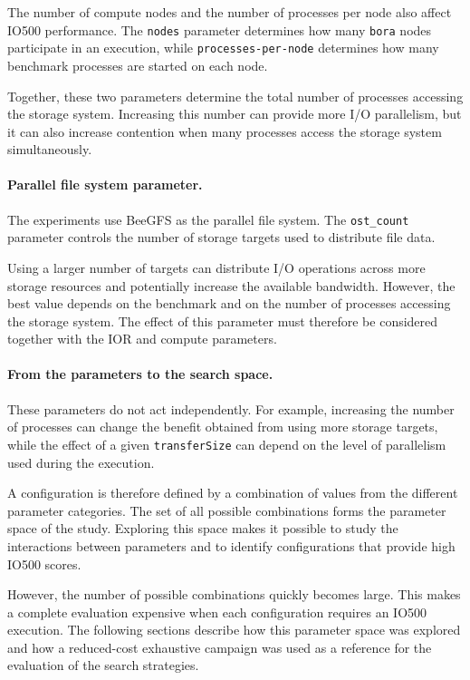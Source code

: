 The number of compute nodes and the number of processes per node also
affect IO500 performance. The \texttt{nodes} parameter determines how many
\texttt{bora} nodes participate in an execution, while
\texttt{processes-per-node} determines how many benchmark processes are
started on each node.

Together, these two parameters determine the total number of processes
accessing the storage system. Increasing this number can provide more I/O
parallelism, but it can also increase contention when many processes
access the storage system simultaneously.

\paragraph{Parallel file system parameter.}

The experiments use BeeGFS as the parallel file system. The
\texttt{ost\_count} parameter controls the number of storage targets used
to distribute file data.

Using a larger number of targets can distribute I/O operations across
more storage resources and potentially increase the available bandwidth.
However, the best value depends on the benchmark and on the number of
processes accessing the storage system. The effect of this parameter must
therefore be considered together with the IOR and compute parameters.

\paragraph{From the parameters to the search space.}

These parameters do not act independently. For example, increasing the
number of processes can change the benefit obtained from using more
storage targets, while the effect of a given \texttt{transferSize} can
depend on the level of parallelism used during the execution.

A configuration is therefore defined by a combination of values from the
different parameter categories. The set of all possible combinations
forms the parameter space of the study. Exploring this space makes it
possible to study the interactions between parameters and to identify
configurations that provide high IO500 scores.

However, the number of possible combinations quickly becomes large. This
makes a complete evaluation expensive when each configuration requires an
IO500 execution. The following sections describe how this parameter space
was explored and how a reduced-cost exhaustive campaign was used as a
reference for the evaluation of the search strategies.


